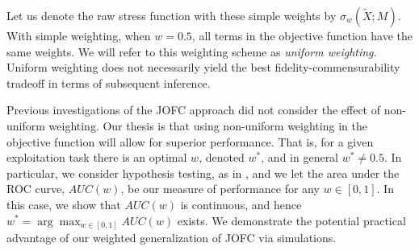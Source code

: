 \documentclass[12pt]{article} %
\begin{document}
 Let us denote the raw stress function with these simple weights by $\sigma_w(\widetilde{X};M)$. With simple weighting, when $w=0.5$, all terms in the objective function have the same weights. We will refer to this weighting scheme as \emph{uniform weighting}. Uniform weighting does not necessarily yield the best fidelity-commensurability tradeoff in terms of subsequent inference. 

 Previous investigations of the JOFC approach \cite{JOFC} did not consider the effect of non-uniform weighting.
Our thesis is that using non-uniform weighting  in the objective function will allow for superior performance.
That is, for a given exploitation task there is an optimal $w$, denoted $w^*$, and in general $w^* \neq 0.5$.
In particular, we consider hypothesis testing, as in \cite{JOFC},
and we let the area under the ROC curve, $AUC(w)$, be our measure of performance for any $w \in [0,1]$.
In this case, we show that $AUC(w)$ is continuous, and hence $w^* = \arg\max_{w \in [0,1]} AUC(w)$ exists.
We demonstrate the potential practical advantage of our weighted generalization of JOFC via simulations.

 

\end{document}
